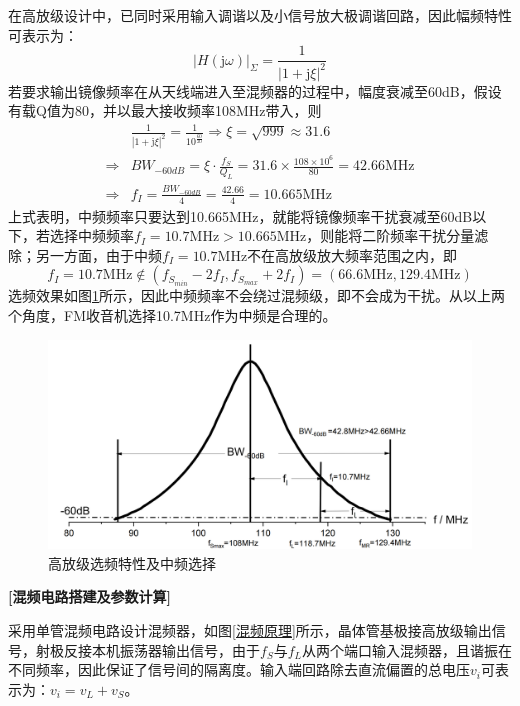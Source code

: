 \documentclass[a4paper,12pt,twoside]{article}
\begin{document}
在高放级设计中，已同时采用输入调谐以及小信号放大极调谐回路，因此幅频特性可表示为：
\begin{equation}
    |H(\mathrm{j}\omega)|_{\Sigma}=\frac{1}{|1+\mathrm{j}\xi|^2}
\end{equation}
若要求输出镜像频率在从天线端进入至混频器的过程中，幅度衰减至60dB，假设有载Q值为80，并以最大接收频率108MHz带入，则
\begin{equation}
    \begin{aligned}
  & \frac{1}{|1+\mathrm{j}\xi|^2}=\frac{1}{10^{\frac{60}{20}}}
    \Rightarrow\xi=\sqrt{999}\approx 31.6\\
    \Rightarrow & BW_{-60dB}=\xi \cdot\frac{f_S}{Q_L}=31.6\times \frac{108\times 10^6}{80}=42.66\mathrm{MHz}\\
    \Rightarrow & f_{I} =  \frac{BW_{-60dB}}{4}=\frac{42.66}{4}=10.665\mathrm{MHz}
    \end{aligned}
\end{equation}
上式表明，中频频率只要达到10.665MHz，就能将镜像频率干扰衰减至60dB以下，若选择中频频率$f_I=10.7\mathrm{MHz}>10.665\mathrm{MHz}$，则能将二阶频率干扰分量滤除；另一方面，由于中频$f_{I}=10.7\mathrm{MHz}$不在高放级放大频率范围之内，即
\begin{equation}
    f_{I}=10.7\mathrm{MHz} \notin (f_{S_{min}}-2f_{I},f_{S_{max}}+2f_{I})=(66.6\mathrm{MHz},129.4\mathrm{MHz})
\end{equation}
选频效果如图\ref{中频选择图形}所示，因此中频频率不会绕过混频级，即不会成为干扰。从以上两个角度，FM收音机选择10.7MHz作为中频是合理的。
\begin{figure}[H]
    \centering
    \includegraphics[scale=0.125]{中频选择图形.png}
    \caption{高放级选频特性及中频选择}
    \label{中频选择图形}
\end{figure}


\textbf{[混频电路搭建及参数计算]}

采用单管混频电路设计混频器，如图\ref{混频原理}所示，晶体管基极接高放级输出信号，射极反接本机振荡器输出信号，由于$f_S$与$f_L$从两个端口输入混频器，且谐振在不同频率，因此保证了信号间的隔离度。输入端回路除去直流偏置的总电压$v_{i}$可表示为：$v_{i}=v_{L}+v_S$。
\end{document}
